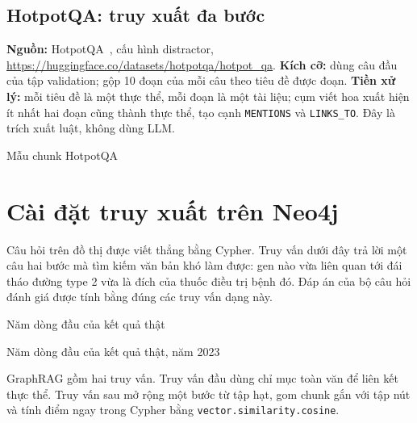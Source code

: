 \subsection{HotpotQA: truy xuất đa bước}

\textbf{Nguồn:} HotpotQA~\cite{ch5hotpot}, cấu hình distractor, \url{https://huggingface.co/datasets/hotpotqa/hotpot_qa}. \textbf{Kích cỡ:} dùng  câu đầu của tập validation; gộp 10 đoạn của mỗi câu theo tiêu đề được  đoạn. \textbf{Tiền xử lý:} mỗi tiêu đề là một thực thể, mỗi đoạn là một tài liệu; cụm viết hoa xuất hiện ít nhất hai đoạn cũng thành thực thể, tạo cạnh \texttt{MENTIONS} và \texttt{LINKS\_TO}. Đây là trích xuất luật, không dùng LLM.

\begin{ketqua}{Mẫu chunk HotpotQA}

\end{ketqua}




\section{Cài đặt truy xuất trên Neo4j}

Câu hỏi trên đồ thị được viết thẳng bằng Cypher. Truy vấn dưới đây trả lời một câu hai bước mà tìm kiếm văn bản khó làm được: gen nào vừa liên quan tới đái tháo đường type 2 vừa là đích của thuốc điều trị bệnh đó. Đáp án của bộ câu hỏi đánh giá được tính bằng đúng các truy vấn dạng này.

\begin{ketqua}{Năm dòng đầu của kết quả thật}

\end{ketqua}
\begin{ketqua}{Năm dòng đầu của kết quả thật, năm 2023}

\end{ketqua}

GraphRAG gồm hai truy vấn. Truy vấn đầu dùng chỉ mục toàn văn để liên kết thực thể. Truy vấn sau mở rộng một bước từ tập hạt, gom chunk gắn với tập nút và tính điểm ngay trong Cypher bằng \texttt{vector.similarity.cosine}.

